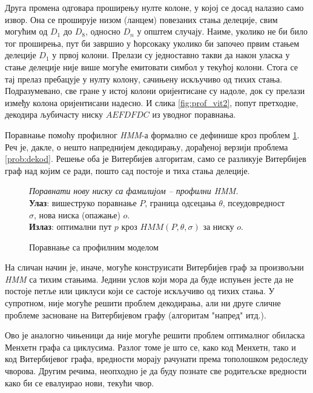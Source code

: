 \documentclass[12pt,oneside]{memoir}
\newenvironment{problem}[1][!ht]
{\renewcommand{\algorithmcfname}{Проблем}
\begin{figure}[!ht]
\centering
  \begin{minipage}{.94\linewidth}
	\begin{algorithm}[#1]%
  }{\end{algorithm}
  \end{minipage}
\end{figure}}
\begin{document}
\begin{CJK}{UTF8}{ipxm}
Друга промена одговара проширењу нулте колоне, у којој се досад налазио само извор. Она се проширује низом (ланцем) повезаних стања делеције, свим могућим од $D_1$ до $D_8$, односно $D_n$ у општем случају. Наиме, уколико не би било тог проширења, пут би завршио у ћорсокаку уколико би започео првим стањем делеције $D_1$ у првој колони. Прелази су једноставно такви да након уласка у стање делеције није више могуће емитовати симбол у текућој колони. Стога се тај прелаз пребацује у нулту колону, сачињену искључиво од тихих стања. Подразумевано, све гране у истој колони оријентисане су надоле, док су прелази између колона оријентисани надесно. И слика \ref{fig:prof_vit2}, попут претходне, декодира љубичасту ниску $AEFDFDC$ из уводног поравнања.

Поравнање помоћу профилног \textit{HMM}-а формално се дефинише кроз проблем \ref{prob:poravnanje}. Реч је, дакле, о нешто напреднијем декодирању, дорађеној верзији проблема \ref{prob:dekod}. Решење оба је Витербијев алгоритам, само се разликује Витербијев граф над којим се ради, пошто сад постоје и тиха стања делеције.

\begin{problem}[H]
  \SetAlgoLined
  \textit{Поравнати нову ниску са фамилијом -- профилни \textit{HMM}.}\\
  \textbf{Улаз}: вишеструко поравнање $P$, граница одсецања $\theta$, псеудовредност $\sigma$, нова ниска (опажање) $o$.\\
  \textbf{Излаз}: оптимални пут $p$ кроз $HMM(P, \theta, \sigma)$ за ниску $o$.
  \caption{Поравнање са профилним моделом \cite{ba10g}}
  \label{prob:poravnanje}
\end{problem}

На сличан начин је, иначе, могуће конструисати Витербијев граф за произвољни \textit{HMM} са тихим стањима. Једини услов који мора да буде испуњен јесте да не постоје петље или циклуси који се састоје искључиво од тихих стања. У супротном, није могуће решити проблем декодирања, али ни друге сличне проблеме засноване на Витербијевом графу (алгоритам "напред" итд.).

Ово је аналогно чињеници да није могуће решити проблем оптималног обиласка Менхетн графа са циклусима. Разлог томе је што се, како код Менхетн, тако и код Витербијевог графа, вредности морају рачунати према тополошком редоследу чворова. Другим речима, неопходно је да буду познате све родитељске вредности како би се евалуирао нови, текући чвор.


\end{CJK}
\end{document}
